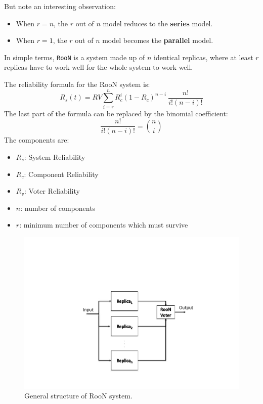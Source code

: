\highspace
But note an interesting observation:\cite{nist8184Model}
\begin{itemize}
    \item When $r=n$, the $r$ out of $n$ model reduces to the \textbf{series} model.
    \item When $r=1$, the $r$ out of $n$ model becomes the \textbf{parallel} model.
\end{itemize}

\highspace
In simple terms, \texttt{RooN} is a system made up of $n$ identical replicas, where at least $r$ replicas have to work well for the whole system to work well.

\highspace
The reliability formula for the RooN system is:
\begin{equation}
	R_{s}\left(t\right) = RV \displaystyle\sum_{i=r}^{n} R_{c}^{i} \left(1 - R_{c}\right)^{n-i} \: \dfrac{n!}{i!\left(n-i\right)!}
\end{equation}
The last part of the formula can be replaced by the binomial coefficient:
\begin{equation*}
	\dfrac{n!}{i!\left(n-i\right)!} = \binom{n}{i}
\end{equation*}
The components are:
\begin{multicols}{2}
	\begin{itemize}
		\item $R_{s}$: System Reliability
		
		\item $R_{c}$: Component Reliability
		
		\item $R_{v}$: Voter Reliability
		
		\item $n$: number of components
		
		\item $r$: minimum number of components which must survive
	\end{itemize}
\end{multicols}
\begin{figure}[!htp]
	\centering
	\includegraphics[width=.6\textwidth]{img/roon-1.pdf}
	\caption{General structure of RooN system.}
\end{figure}

